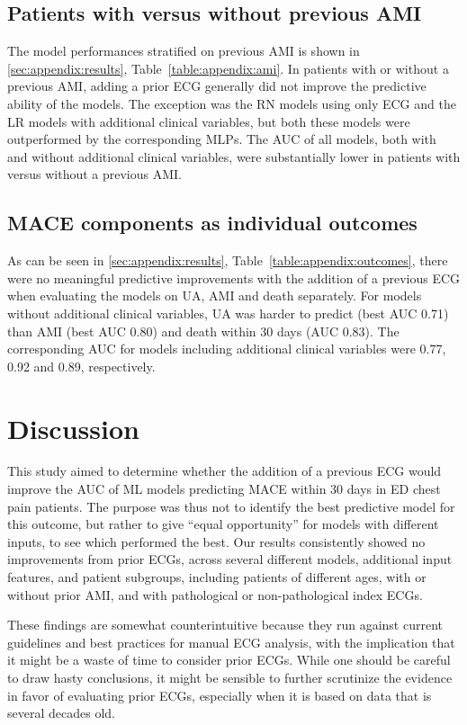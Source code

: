 \documentclass[preprint]{elsarticle}
\begin{document}
\subsection{Patients with versus without previous AMI}
The model performances stratified on previous AMI is shown in \ref{sec:appendix:results}, Table~\ref{table:appendix:ami}. In patients with or without a previous AMI, adding a prior ECG generally did not improve the predictive ability of the models. The exception was the RN models using only ECG and the LR models with additional clinical variables, but both these models were outperformed by the corresponding MLPs. The AUC of all models, both with and without additional clinical variables, were substantially lower in patients with versus without a previous AMI. 

\subsection{MACE components as individual outcomes}
As can be seen in \ref{sec:appendix:results}, Table~\ref{table:appendix:outcomes}, there were no meaningful predictive improvements with the addition of a previous ECG when evaluating the models on UA, AMI and death separately. For models without additional clinical variables, UA was harder to predict (best AUC 0.71) than AMI (best AUC 0.80) and death within 30 days (AUC 0.83). The corresponding AUC for models including additional clinical variables were 0.77, 0.92 and 0.89, respectively. 

\section{Discussion}
This study aimed to determine whether the addition of a previous ECG would improve the AUC of ML models predicting MACE within 30 days in ED chest pain patients. The purpose was thus not to identify the best predictive model for this outcome, but rather to give ``equal opportunity'' for models with different inputs, to see which performed the best. Our results consistently showed no improvements from prior ECGs, across several different models, additional input features, and patient subgroups, including patients of different ages, with or without prior AMI, and with pathological or non-pathological index ECGs.

These findings are somewhat counterintuitive because they run against current guidelines and best practices for manual ECG analysis, with the implication that it might be a waste of time to consider prior ECGs. While one should be careful to draw hasty conclusions, it might be sensible to further scrutinize the evidence in favor of evaluating prior ECGs, especially when it is based on data that is several decades old.
\end{document}
